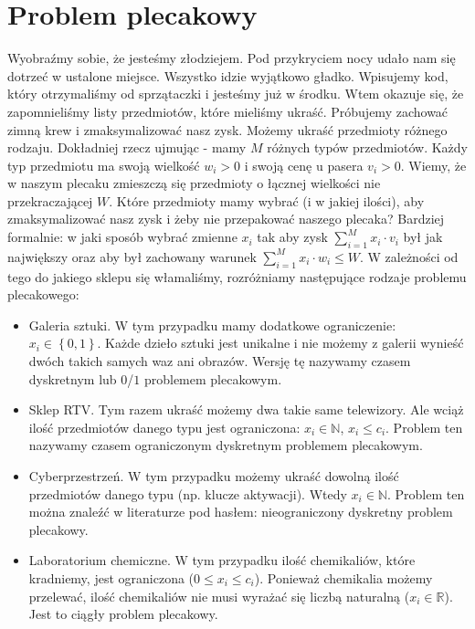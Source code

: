 \section{Problem plecakowy}

\label{sec:plecaki}

Wyobraźmy sobie, że jesteśmy złodziejem.
Pod przykryciem nocy udało nam się dotrzeć w ustalone miejsce.
Wszystko idzie wyjątkowo gładko.
Wpisujemy kod, który otrzymaliśmy od sprzątaczki i jesteśmy już w środku.
Wtem okazuje się, że zapomnieliśmy listy przedmiotów, które mieliśmy ukraść.
Próbujemy zachować zimną krew i zmaksymalizować nasz zysk.
Możemy ukraść przedmioty różnego rodzaju.
Dokładniej rzecz ujmując - mamy $M$ różnych typów przedmiotów.
Każdy typ przedmiotu ma swoją wielkość $w_i > 0$ i swoją cenę u pasera $v_i > 0$.
Wiemy, że w naszym plecaku zmieszczą się przedmioty o łącznej wielkości nie przekraczającej $W$.
Które przedmioty mamy wybrać (i w jakiej ilości), aby zmaksymalizować nasz zysk i żeby nie przepakować naszego plecaka?
Bardziej formalnie: w jaki sposób wybrać zmienne $x_i$ tak aby zysk $\sum_{i=1}^{M} x_i \cdot v_i$ był jak największy oraz aby był
zachowany warunek $\sum_{i=1}^{M} x_i \cdot w_i \leq W$.
W zależności od tego do jakiego sklepu się włamaliśmy, rozróżniamy następujące rodzaje problemu plecakowego:
\begin{itemize}
  \item Galeria sztuki.
  W tym przypadku mamy dodatkowe ograniczenie: $x_i \in \left \{ 0, 1 \right \}$.
  Każde dzieło sztuki jest unikalne i nie możemy z galerii wynieść dwóch takich samych waz ani obrazów.
  Wersję tę nazywamy czasem dyskretnym lub $0$/$1$ problemem plecakowym.
  \item Sklep RTV.
  Tym razem ukraść możemy dwa takie same telewizory.
  Ale wciąż ilość przedmiotów danego typu jest ograniczona: $x_i \in \mathbb{N}$, $x_i \leq c_i$.
  Problem ten nazywamy czasem ograniczonym dyskretnym problemem plecakowym.
  \item Cyberprzestrzeń.
  W tym przypadku możemy ukraść dowolną ilość przedmiotów danego typu (np. klucze aktywacji).
  Wtedy $x_i \in \mathbb{N}$.
  Problem ten można znaleźć w literaturze pod hasłem: nieograniczony dyskretny problem plecakowy.
  \item Laboratorium chemiczne.
  W tym przypadku ilość chemikaliów, które kradniemy, jest ograniczona ($0 \leq x_i \leq c_i$).
  Ponieważ chemikalia możemy przelewać, ilość chemikaliów nie musi wyrażać się liczbą naturalną ($x_i \in \mathbb{R}$).
  Jest to ciągły problem plecakowy.
\end{itemize}

